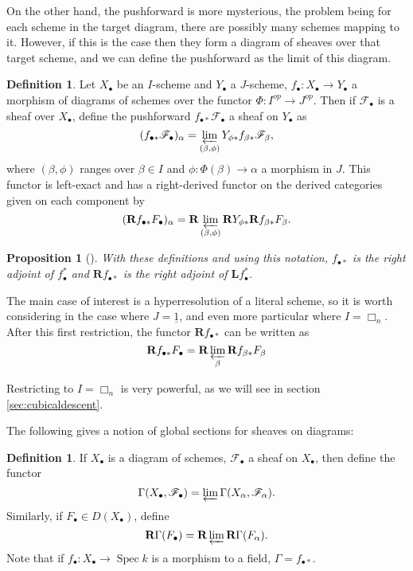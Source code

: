 \documentclass[proquest]{uwthesis}[2014/11/13]
\newtheorem{prop}[theorem]{Proposition}
\theoremstyle{definition}
\newtheorem{definition}[theorem]{Definition}
\DeclareMathOperator{\Spec}{Spec}
\newcommand{\FF}{\mathscr{F}}
\newcommand{\bL}{\textbf{L}}
\newcommand{\bR}{\textbf{R}}
\begin{document}
On the other hand, the pushforward is more mysterious, the problem being for each scheme in the target diagram, there are possibly many schemes mapping to it.
However, if this is the case then they form a diagram of sheaves over that target scheme, and we can define the pushforward as the limit of this diagram.

\begin{definition}
	\label{def:pushforward}
	Let $X_\bullet$ be an $I$-scheme and $Y_\bullet$ a $J$-scheme, $f_\bullet : X_\bullet \rightarrow Y_\bullet$ a morphism of diagrams of schemes over the functor $\Phi : I^{op} \rightarrow J^{op}$.
	Then if $\FF_\bullet$ is a sheaf over $X_\bullet$, define the pushforward $f_{\bullet*} \FF_\bullet$ a sheaf on $Y_\bullet$ as
	\[
	(f_{\bullet*} \FF_\bullet)_\alpha = \varprojlim_{(\beta, \phi)} Y_{\phi *} f_{\beta *} \FF_\beta,
	\]
	where $(\beta, \phi)$ ranges over $\beta \in I$ and $\phi : \Phi(\beta) \rightarrow \alpha$ a morphism in $J$.
	This functor is left-exact and has a right-derived functor on the derived categories given on each component by
	\[
	(\bR f_{\bullet*} F_\bullet)_\alpha = \bR \varprojlim_{(\beta, \phi)} \bR Y_{\phi *} \bR f_{\beta *} F_\beta.
	\]
\end{definition}

\begin{prop}[{\cite[I 5.5]{Guillen1988}}]
	With these definitions and using this notation, $f_{\bullet *}$ is the right adjoint of $f_\bullet^*$ and $\bR f_{\bullet *}$ is the right adjoint of $\bL f_\bullet^*$.
\end{prop}



The main case of interest is a hyperresolution of a literal scheme, so it is worth considering in the case where $J = \underline{1}$, and even more particular where $I = \Box_n$.
After this first restriction, the functor $\bR f_{\bullet *}$ can be written as
\[
\bR f_{\bullet*} F_\bullet = \bR \varprojlim_\beta \bR f_{\beta *} F_\beta
\]

Restricting to $I = \Box_n$ is very powerful, as we will see in section \ref{sec:cubicaldescent}.

The following gives a notion of global sections for sheaves on diagrams:

\begin{definition}
	If $X_\bullet$ is a diagram of schemes, $\FF_\bullet$ a sheaf on $X_\bullet$, then define the functor
	\[
	\Gamma(X_\bullet, \FF_\bullet) = \varprojlim \Gamma(X_\alpha, \FF_\alpha).
	\]
	Similarly, if $F_\bullet \in D(X_\bullet)$, define
	\[
	\bR \Gamma(F_\bullet) = \bR \varprojlim \bR \Gamma(F_\alpha).
	\]
	Note that if $f_\bullet : X_\bullet \rightarrow \Spec k$ is a morphism to a field, $\Gamma = f_{\bullet *}$.
\end{definition}
\end{document}
